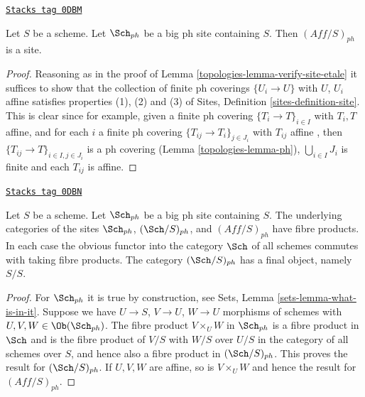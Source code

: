 \begin{lemma}
\label{topologies-lemma-verify-site-ph}
\href{https://stacks.math.columbia.edu/tag/0DBM}{\texttt{Stacks tag 0DBM}}

Let $S$ be a scheme. Let $\Sch_{ph}$ be a big ph
site containing $S$. Then $(\textit{Aff}/S)_{ph}$ is a site.
\end{lemma}

\begin{proof}

Reasoning as in the proof of Lemma \ref{topologies-lemma-verify-site-etale}
it suffices to show that the collection of finite ph coverings
$\{U_i \to U\}$ with $U$, $U_i$ affine satisfies properties
(1), (2) and (3) of
Sites, Definition \ref{sites-definition-site}.
This is clear since for example, given a finite ph covering
$\{T_i \to T\}_{i\in I}$ with $T_i, T$ affine, and for each
$i$ a finite ph covering $\{T_{ij} \to T_i\}_{j\in J_i}$ with $T_{ij}$
affine , then $\{T_{ij} \to T\}_{i \in I, j\in J_i}$ is a ph covering
(Lemma \ref{topologies-lemma-ph}), $\bigcup_{i\in I} J_i$ is finite and
each $T_{ij}$ is affine.
\end{proof}

\begin{lemma}
\label{topologies-lemma-fibre-products-ph}
\href{https://stacks.math.columbia.edu/tag/0DBN}{\texttt{Stacks tag 0DBN}}

Let $S$ be a scheme. Let $\Sch_{ph}$ be a big ph
site containing $S$. The underlying categories of the sites
$\Sch_{ph}$, $(\Sch/S)_{ph}$, and $(\textit{Aff}/S)_{ph}$ have fibre products.
In each case the obvious functor into the category $\Sch$ of
all schemes commutes with taking fibre products. The category
$(\Sch/S)_{ph}$ has a final object, namely $S/S$.
\end{lemma}

\begin{proof}
For $\Sch_{ph}$ it is true by construction, see
Sets, Lemma \ref{sets-lemma-what-is-in-it}.
Suppose we have $U \to S$, $V \to U$, $W \to U$ morphisms
of schemes with $U, V, W \in \Ob(\Sch_{ph})$.
The fibre product $V \times_U W$ in $\Sch_{ph}$
is a fibre product in $\Sch$ and
is the fibre product of $V/S$ with $W/S$ over $U/S$ in
the category of all schemes over $S$, and hence also a
fibre product in $(\Sch/S)_{ph}$.
This proves the result for $(\Sch/S)_{ph}$.
If $U, V, W$ are affine, so is $V \times_U W$ and hence the
result for $(\textit{Aff}/S)_{ph}$.
\end{proof}

